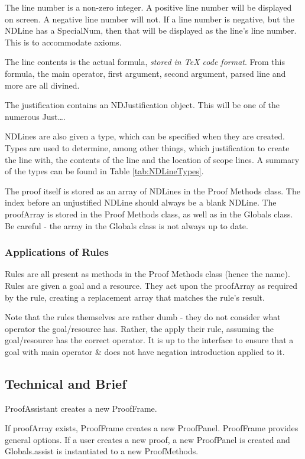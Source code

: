 \documentclass[a4paper]{article}
\begin{document}
The line number is a non-zero integer. A positive line number will be displayed on screen. A negative line number will not. If a line number is negative, but the NDLine has a SpecialNum, then that will be displayed as the line's line number. This is to accommodate axioms.

The line contents is the actual formula, \emph{stored in {\TeX} code format}. From this formula, the main operator, first argument, second argument, parsed line and more are all divined.

The justification contains an NDJustification object. This will be one of the numerous Just\dots.

NDLines are also given a type, which can be specified when they are created. Types are used to determine, among other things, which justification to create the line with, the contents of the line and the location of scope lines. A summary of the types can be found in Table \ref{tab:NDLineTypes}.

The proof itself is stored as an array of NDLines in the Proof Methods class. The index before an unjustified NDLine should always be a blank NDLine. The proofArray is stored in the Proof Methods class, as well as in the Globals class. Be careful - the array in the Globals class is not always up to date.

\subsubsection{Applications of Rules}
Rules are all present as methods in the Proof Methods class (hence the name). Rules are given a goal and a resource. They act upon the proofArray as required by the rule, creating a replacement array that matches the rule's result.

Note that the rules themselves are rather dumb - they do not consider what operator the goal/resource has. Rather, the apply their rule, assuming the goal/resource has the correct operator. It is up to the interface to ensure that a goal with main operator \& does not have negation introduction applied to it.


\subsection{Technical and Brief}
ProofAssistant creates a new ProofFrame.

If proofArray exists, ProofFrame creates a new ProofPanel. ProofFrame provides general options. If a user creates a new proof, a new ProofPanel is created and Globals.assist is instantiated to a new ProofMethods.
\end{document}
